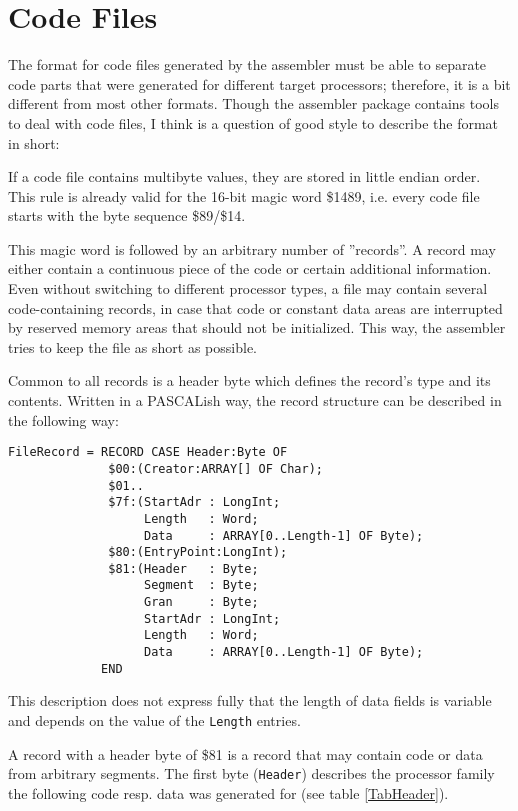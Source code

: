 \documentclass[12pt,twoside]{report}
\newcommand{\tty}[1]{{\tt #1}}
\begin{document}

\section{Code Files}
\label{SectCodeFormat}

The format for code files generated by the assembler must be able to
separate code parts that were generated for different target
processors; therefore, it is a bit different from most other formats.
Though the assembler package contains tools to deal with code files,
I think is a question of good style to describe the format in short:

If a code file contains multibyte values, they are stored in little
endian order.  This rule is already valid for the 16-bit magic word
\$1489, i.e. every code file starts with the byte sequence \$89/\$14.

This magic word is followed by an arbitrary number of ''records''.  A
record may either contain a continuous piece of the code or certain
additional information.  Even without switching to different
processor types, a file may contain several code-containing records,
in case that code or constant data areas are interrupted by reserved
memory areas that should not be initialized.  This way, the assembler
tries to keep the file as short as possible.

Common to all records is a header byte which defines the record's type
and its contents.  Written in a PASCALish way, the record structure
can be described in the following way:
\begin{verbatim}
FileRecord = RECORD CASE Header:Byte OF
              $00:(Creator:ARRAY[] OF Char);
              $01..
              $7f:(StartAdr : LongInt;
                   Length   : Word;
                   Data     : ARRAY[0..Length-1] OF Byte);
              $80:(EntryPoint:LongInt);
              $81:(Header   : Byte;
                   Segment  : Byte;
                   Gran     : Byte;
                   StartAdr : LongInt;
                   Length   : Word;
                   Data     : ARRAY[0..Length-1] OF Byte);
             END
\end{verbatim}
This description does not express fully that the length of data
fields is variable and depends on the value of the \tty{Length} entries.

A record with a header byte of \$81 is a record that may contain code
or data from arbitrary segments.  The first byte (\tty{Header}) describes
the processor family the following code resp. data was generated for (see
table \ref{TabHeader}).
\end{document}
